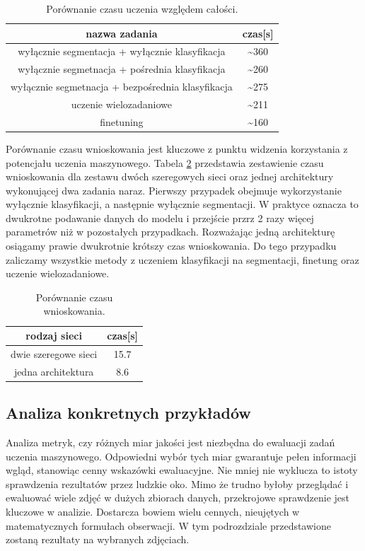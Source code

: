 \begin{table}[ht!]
    \centering
    \begin{tabular}{c|c}
        nazwa zadania                      &   czas{[}s{]} \\ \hline
        wyłącznie segmentacja +  wyłącznie klasyfikacja & \textasciitilde 360 \\
        wyłącznie segmetnacja + pośrednia klasyfikacja & \textasciitilde 260 \\
        wyłącznie segmetnacja + bezpośrednia klasyfikacja & \textasciitilde 275 \\
        uczenie wielozadaniowe                   &   \textasciitilde 211 \\
        finetuning                        &   \textasciitilde 160 
\end{tabular}
\caption{Porównanie czasu uczenia względem całości.}
\label{tab:por-trening-all}
\end{table}


Porównanie czasu wnioskowania jest kluczowe z punktu widzenia korzystania z potencjału uczenia maszynowego. Tabela \ref{tab:por-infer} przedstawia zestawienie czasu wnioskowania dla zestawu dwóch szeregowych sieci oraz jednej architektury wykonującej dwa zadania naraz. Pierwszy przypadek obejmuje wykorzystanie wyłącznie klasyfikacji, a następnie wyłącznie segmentacji. W praktyce oznacza to dwukrotne podawanie danych do modelu i przejście przrz 2 razy więcej parametrów niż w pozostałych przypadkach. Rozważając jedną architekturę osiągamy prawie dwukrotnie krótszy czas wnioskowania. Do tego przypadku zaliczamy wszystkie metody z uczeniem klasyfikacji na segmentacji, finetung oraz uczenie wielozadaniowe.


\begin{table}[ht!]
    \centering
    \begin{tabular}{c|c}
        rodzaj sieci                      &   czas{[}s{]} \\ \hline
        dwie szeregowe sieci                  &   15.7\\
        jedna architektura               &   8.6
\end{tabular}
\caption{Porównanie czasu wnioskowania.}
\label{tab:por-infer}
\end{table}

\subsection{Analiza konkretnych przykładów}
Analiza metryk, czy różnych miar jakości jest niezbędna do ewaluacji zadań uczenia maszynowego. Odpowiedni wybór tych miar gwarantuje pełen informacji wgląd, stanowiąc cenny wskazówki ewaluacyjne. Nie mniej nie wyklucza to istoty sprawdzenia rezultatów przez ludzkie oko. Mimo że trudno byłoby przeglądać i ewaluować wiele zdjęć w dużych zbiorach danych, przekrojowe sprawdzenie jest kluczowe w analizie. Dostarcza bowiem wielu cennych, nieujętych w matematycznych formułach obserwacji. W tym podrozdziale przedstawione zostaną rezultaty na wybranych zdjęciach.
